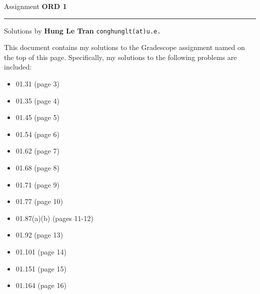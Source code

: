 \documentclass{amsart}
\begin{document}
\Large
\noindent
Assignment {\bf ORD 1}   %

\medskip\noindent
\hrule


\medskip\noindent
Solutions by {\bf Hung Le Tran} \qquad   %
  {\tt conghunglt(at)u.e.}      %

\vspace{0.5cm}

\noindent
This document contains my solutions to
the Gradescope assignment named on the top of this page.
Specifically, my solutions to the following problems
are included:

\vspace{0.4cm}
\begin{itemize}  %
\item 01.31 (page 3)
\item 01.35 (page 4)
\item 01.45 (page 5)
\item 01.54 (page 6)
\item 01.62 (page 7)
\item 01.68 (page 8)
\item 01.71 (page 9)
\item 01.77 (page 10)
\item 01.87(a)(b) (pages 11-12)
\item 01.92 (page 13)
\item 01.101 (page 14)
\item 01.151 (page 15)
\item 01.164 (page 16)
\end{itemize}

\vspace{0.5cm}
\end{document}
